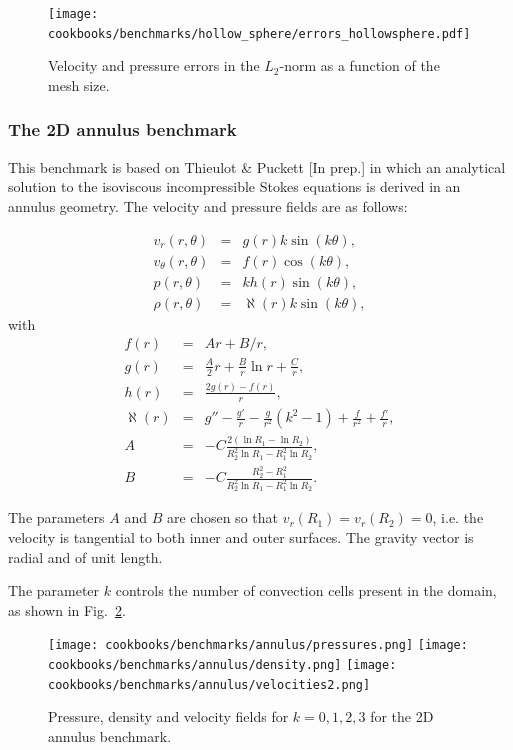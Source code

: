 \documentclass{article}
\begin{document}
\begin{figure}
\centering
\texttt{[image: cookbooks/benchmarks/hollow\_sphere/errors\_hollowsphere.pdf]}
\caption{Velocity and pressure errors in the $L_2$-norm as a function of the mesh size.}
\label{fig:hollow-sphere-errors}
\end{figure}


\subsubsection{The 2D annulus benchmark}
\label{sec:cookbooks-annulus}

This benchmark is based on Thieulot \& Puckett [In prep.] in which an analytical solution to the
isoviscous incompressible Stokes equations is derived in an annulus geometry.
The velocity and pressure fields are as follows:

\begin{eqnarray}
v_r(r,\theta)     &=&  g(r) k \sin(k\theta), \\
v_\theta(r,\theta)&=&  f(r) \cos(k \theta), \\ 
p(r,\theta)       &=&  k h(r) \sin(k \theta), \\
\rho (r,\theta)   &=& \aleph(r) k \sin (k \theta), 
\end{eqnarray}
with
\begin{eqnarray}
f(r)&=&Ar+B/r, \\
g(r) &=& \frac{A}{2}r  +  \frac{B}{r} \ln r + \frac{C}{r}, \\
h(r)&=& \frac{2g(r)-f(r)}{r},  \\
\aleph(r) &=& g'' - \frac{g'}{r}  - \frac{g}{r^2} (k^2 - 1)  + \frac{f}{r^2}   + \frac{f'}{r}, \\
A &=& -C\frac{2(\ln R_1 - \ln R_2)} { R_2^2 \ln R_1  - R_1^2 \ln R_2}, \\
B &=& -C \frac{R_2^2-R_1^2}{R_2^2 \ln R_1 - R_1^2 \ln R_2}.
\end{eqnarray}

The parameters $A$ and $B$ are chosen so that $v_r(R_1)=v_r(R_2)=0$, i.e.
the velocity is tangential to both inner and outer surfaces.
The gravity vector is radial and of unit length.

The parameter $k$ controls the number of convection cells present in the domain,
as shown in Fig.~\ref{fig:annulus-vp}.

\begin{figure}
\centering
\texttt{[image: cookbooks/benchmarks/annulus/pressures.png]}
\texttt{[image: cookbooks/benchmarks/annulus/density.png]}
\texttt{[image: cookbooks/benchmarks/annulus/velocities2.png]}
\caption{Pressure, density and velocity fields for $k=0,1,2,3$ for the 2D annulus benchmark.}
\label{fig:annulus-vp}
\end{figure}
\end{document}
